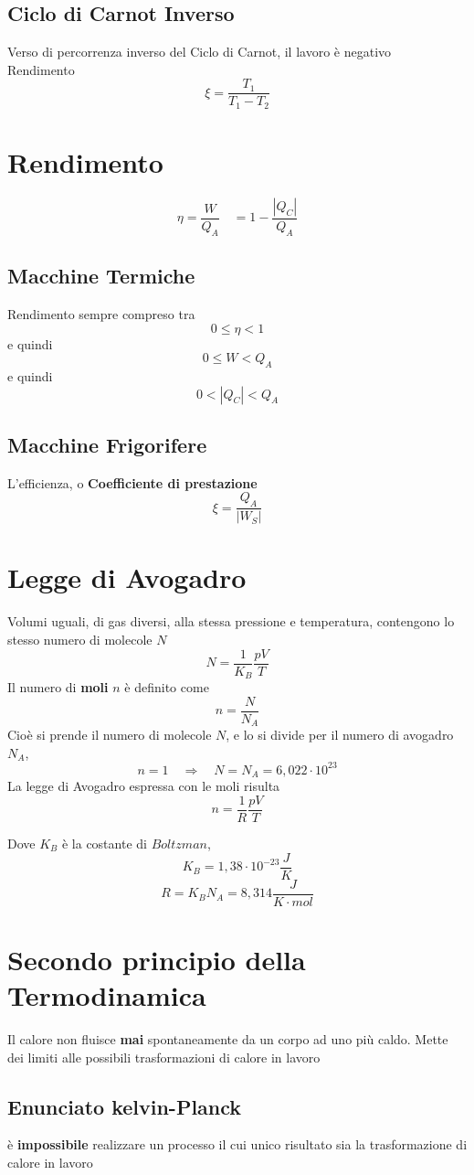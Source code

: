 \documentclass[a4paper]{report}
\begin{document}
  \subsection{Ciclo di Carnot Inverso}
  Verso di percorrenza inverso del Ciclo di Carnot, il lavoro è negativo \\
  Rendimento
  $$ \xi = \frac{T_1}{T_1 - T_2} $$

  \section{Rendimento}
  $$ \eta=\frac{W}{Q_A} \quad = 1- \frac{|Q_C|}{Q_A}$$
  \subsection{Macchine Termiche}
  Rendimento sempre compreso tra
  $$0 \leq \eta < 1$$
  e quindi
  $$0 \leq W < Q_A $$
  e quindi
  $$ 0 < |Q_C| < Q_A $$
  \subsection {Macchine Frigorifere}
  L'efficienza, o \textbf{Coefficiente di prestazione}
  $$ \xi = \frac{Q_A}{|W_S|}  $$

  \section{Legge di Avogadro}
  Volumi uguali, di gas diversi, alla stessa pressione e temperatura, contengono lo stesso numero di molecole $N$
  $$ N = \frac{1}{K_B} \frac{pV}{T} $$
  Il numero di \textbf{moli} $n$ è definito come
  $$ n = \frac{N}{N_A} $$
  Cioè si prende il numero di molecole $N$, e lo si divide per il numero di avogadro $N_A$,
  $$ n = 1 \quad \Rightarrow \quad N = N_A = 6,022 \cdot 10^{23}$$
  La legge di Avogadro espressa con le moli risulta
  $$ n = \frac{1}{R} \frac{pV}{T} $$

  Dove $K_B$ è la costante di $Boltzman$,
  $$ K_B = 1,38 \cdot 10^{-23} \frac{J}{K}$$
  $$ R = K_B N_A = 8,314 \frac{J}{K \cdot mol} $$

  \section{Secondo principio della Termodinamica}
  Il calore non fluisce \textbf{mai} spontaneamente da un corpo ad uno più caldo.
  Mette dei limiti alle possibili trasformazioni di calore in lavoro
  \subsection{Enunciato kelvin-Planck}
  è \textbf{impossibile} realizzare un processo il cui unico risultato sia la trasformazione di calore in lavoro
\end{document}
